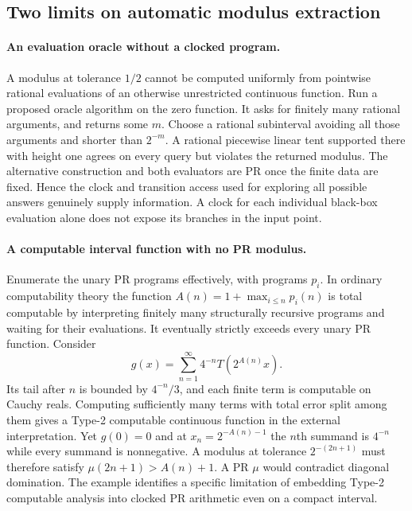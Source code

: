 \subsection{Two limits on automatic modulus extraction}
\paragraph{An evaluation oracle without a clocked program.}
A modulus at tolerance $1/2$ cannot be computed uniformly from pointwise rational evaluations of an otherwise unrestricted continuous function. Run a proposed oracle algorithm on the zero function. It asks for finitely many rational arguments, and returns some $m$. Choose a rational subinterval avoiding all those arguments and shorter than $2^{-m}$. A rational piecewise linear tent supported there with height one agrees on every query but violates the returned modulus. The alternative construction and both evaluators are PR once the finite data are fixed. Hence the clock and transition access used for exploring all possible answers genuinely supply information. A clock for each individual black-box evaluation alone does not expose its branches in the input point.

\paragraph{A computable interval function with no PR modulus.}
Enumerate the unary PR programs effectively, with programs $p_i$. In ordinary computability theory the function $A(n)=1+\max_{i\le n}p_i(n)$ is total computable by interpreting finitely many structurally recursive programs and waiting for their evaluations. It eventually strictly exceeds every unary PR function. Consider
\[
                     g(x)=\sum_{n=1}^\infty 4^{-n}T(2^{A(n)}x).
\]
Its tail after $n$ is bounded by $4^{-n}/3$, and each finite term is computable on Cauchy reals. Computing sufficiently many terms with total error split among them gives a Type-2 computable continuous function in the external interpretation. Yet $g(0)=0$ and at $x_n=2^{-A(n)-1}$ the $n$th summand is $4^{-n}$ while every summand is nonnegative. A modulus at tolerance $2^{-(2n+1)}$ must therefore satisfy $\mu(2n+1)>A(n)+1$. A PR $\mu$ would contradict diagonal domination. The example identifies a specific limitation of embedding Type-2 computable analysis into clocked PR arithmetic even on a compact interval.
